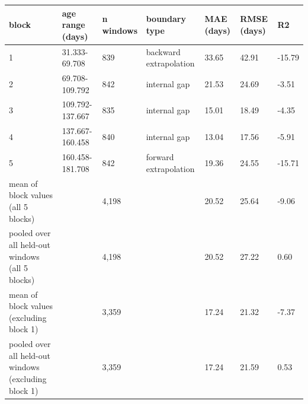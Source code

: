 \begin{tabular}{lllllll}
\hline
block & age range (days) & n windows & boundary type & MAE (days) & RMSE (days) & R2 \\
\hline
1 & 31.333-69.708 & 839 & backward extrapolation & 33.65 & 42.91 & -15.79 \\
2 & 69.708-109.792 & 842 & internal gap & 21.53 & 24.69 & -3.51 \\
3 & 109.792-137.667 & 835 & internal gap & 15.01 & 18.49 & -4.35 \\
4 & 137.667-160.458 & 840 & internal gap & 13.04 & 17.56 & -5.91 \\
5 & 160.458-181.708 & 842 & forward extrapolation & 19.36 & 24.55 & -15.71 \\
mean of block values (all 5 blocks) &  & 4,198 &  & 20.52 & 25.64 & -9.06 \\
pooled over all held-out windows (all 5 blocks) &  & 4,198 &  & 20.52 & 27.22 & 0.60 \\
mean of block values (excluding block 1) &  & 3,359 &  & 17.24 & 21.32 & -7.37 \\
pooled over all held-out windows (excluding block 1) &  & 3,359 &  & 17.24 & 21.59 & 0.53 \\
\hline
\end{tabular}
